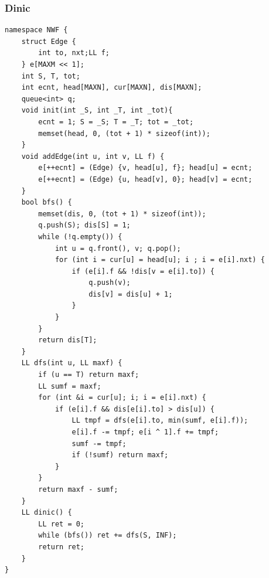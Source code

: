 \documentclass[10pt]{ctexart}
\begin{document}
{\subsubsection{Dinic}
\begin{lstlisting}
namespace NWF {
    struct Edge {
        int to, nxt;LL f;
    } e[MAXM << 1]; 
    int S, T, tot;
    int ecnt, head[MAXN], cur[MAXN], dis[MAXN];
    queue<int> q;
    void init(int _S, int _T, int _tot){
        ecnt = 1; S = _S; T = _T; tot = _tot;
        memset(head, 0, (tot + 1) * sizeof(int));
    } 
    void addEdge(int u, int v, LL f) {
        e[++ecnt] = (Edge) {v, head[u], f}; head[u] = ecnt;
        e[++ecnt] = (Edge) {u, head[v], 0}; head[v] = ecnt;
    }
    bool bfs() {
        memset(dis, 0, (tot + 1) * sizeof(int));
        q.push(S); dis[S] = 1;
        while (!q.empty()) {
            int u = q.front(), v; q.pop();
            for (int i = cur[u] = head[u]; i ; i = e[i].nxt) {
                if (e[i].f && !dis[v = e[i].to]) {
                    q.push(v);
                    dis[v] = dis[u] + 1;
                }
            }
        }
        return dis[T];
    }
    LL dfs(int u, LL maxf) {
        if (u == T) return maxf;
        LL sumf = maxf;
        for (int &i = cur[u]; i; i = e[i].nxt) {
            if (e[i].f && dis[e[i].to] > dis[u]) {
                LL tmpf = dfs(e[i].to, min(sumf, e[i].f));
                e[i].f -= tmpf; e[i ^ 1].f += tmpf;
                sumf -= tmpf;
                if (!sumf) return maxf;
            }
        }
        return maxf - sumf;
    }
    LL dinic() {
        LL ret = 0;
        while (bfs()) ret += dfs(S, INF);
        return ret;
    }
}
\end{lstlisting}
}
\end{document}
